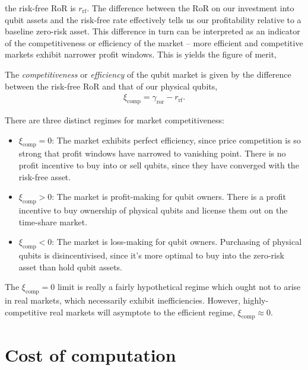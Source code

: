  the risk-free RoR is $r_\mathrm{rf}$. The difference between the RoR on our investment into qubit assets and the risk-free rate effectively tells us our profitability relative to a baseline zero-risk asset. This difference in turn can be interpreted as an indicator of the competitiveness or efficiency of the market -- more efficient and competitive markets exhibit narrower profit windows. This is yields the figure of merit,

\begin{postulate}\label{post:market_comp}
The \textit{competitiveness} or \textit{efficiency} of the qubit market is given by the difference between the risk-free RoR and that of our physical qubits,
\begin{align}
\xi_\mathrm{comp} = \gamma_\mathrm{ror} - r_\mathrm{rf}.
\end{align}

There are three distinct regimes for market competitiveness:
\begin{itemize}
	\item \mbox{$\xi_\mathrm{comp}=0$}: The market exhibits perfect efficiency, since price competition is so strong that profit windows have narrowed to vanishing point. There is no profit incentive to buy into or sell qubits, since they have converged with the risk-free asset.
	\item \mbox{$\xi_\mathrm{comp}>0$}: The market is profit-making for qubit owners. There is a profit incentive to buy ownership of physical qubits and license them out on the time-share market.
	\item \mbox{$\xi_\mathrm{comp}<0$}: The market is loss-making for qubit owners. Purchasing of physical qubits is disincentivised, since it's more optimal to buy into the zero-risk asset than hold qubit assets.
\end{itemize}
\end{postulate}

The \mbox{$\xi_\textrm{comp}=0$} limit is really a fairly hypothetical regime which ought not to arise in real markets, which necessarily exhibit inefficiencies. However, highly-competitive real markets will asymptote to the efficient regime, \mbox{$\xi_\textrm{comp}\approx 0$}.

%
%

\section{Cost of computation}\label{sec:cost_of_comp} 


